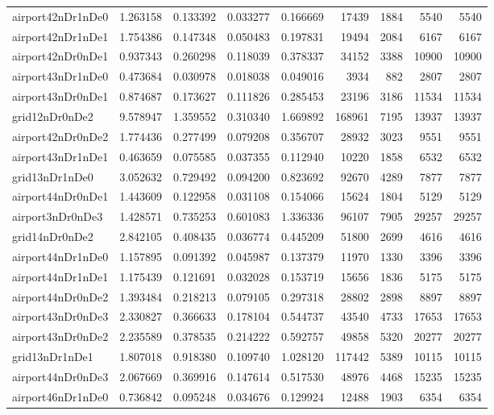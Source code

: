 \begin{longtable}{|l|r|r|r|r|r|r|r|r|}
airport42nDr1nDe0 & 1.263158 & 0.133392 & 0.033277 & 0.166669 & 17439 & 1884 & 5540 & 5540 \\
airport42nDr1nDe1 & 1.754386 & 0.147348 & 0.050483 & 0.197831 & 19494 & 2084 & 6167 & 6167 \\
airport42nDr0nDe1 & 0.937343 & 0.260298 & 0.118039 & 0.378337 & 34152 & 3388 & 10900 & 10900 \\
airport43nDr1nDe0 & 0.473684 & 0.030978 & 0.018038 & 0.049016 & 3934 & 882 & 2807 & 2807 \\
airport43nDr0nDe1 & 0.874687 & 0.173627 & 0.111826 & 0.285453 & 23196 & 3186 & 11534 & 11534 \\
grid12nDr0nDe2 & 9.578947 & 1.359552 & 0.310340 & 1.669892 & 168961 & 7195 & 13937 & 13937 \\
airport42nDr0nDe2 & 1.774436 & 0.277499 & 0.079208 & 0.356707 & 28932 & 3023 & 9551 & 9551 \\
airport43nDr1nDe1 & 0.463659 & 0.075585 & 0.037355 & 0.112940 & 10220 & 1858 & 6532 & 6532 \\
grid13nDr1nDe0 & 3.052632 & 0.729492 & 0.094200 & 0.823692 & 92670 & 4289 & 7877 & 7877 \\
airport44nDr0nDe1 & 1.443609 & 0.122958 & 0.031108 & 0.154066 & 15624 & 1804 & 5129 & 5129 \\
airport3nDr0nDe3 & 1.428571 & 0.735253 & 0.601083 & 1.336336 & 96107 & 7905 & 29257 & 29257 \\
grid14nDr0nDe2 & 2.842105 & 0.408435 & 0.036774 & 0.445209 & 51800 & 2699 & 4616 & 4616 \\
airport44nDr1nDe0 & 1.157895 & 0.091392 & 0.045987 & 0.137379 & 11970 & 1330 & 3396 & 3396 \\
airport44nDr1nDe1 & 1.175439 & 0.121691 & 0.032028 & 0.153719 & 15656 & 1836 & 5175 & 5175 \\
airport44nDr0nDe2 & 1.393484 & 0.218213 & 0.079105 & 0.297318 & 28802 & 2898 & 8897 & 8897 \\
airport43nDr0nDe3 & 2.330827 & 0.366633 & 0.178104 & 0.544737 & 43540 & 4733 & 17653 & 17653 \\
airport43nDr0nDe2 & 2.235589 & 0.378535 & 0.214222 & 0.592757 & 49858 & 5320 & 20277 & 20277 \\
grid13nDr1nDe1 & 1.807018 & 0.918380 & 0.109740 & 1.028120 & 117442 & 5389 & 10115 & 10115 \\
airport44nDr0nDe3 & 2.067669 & 0.369916 & 0.147614 & 0.517530 & 48976 & 4468 & 15235 & 15235 \\
airport46nDr1nDe0 & 0.736842 & 0.095248 & 0.034676 & 0.129924 & 12488 & 1903 & 6354 & 6354 \\

\end{longtable}
